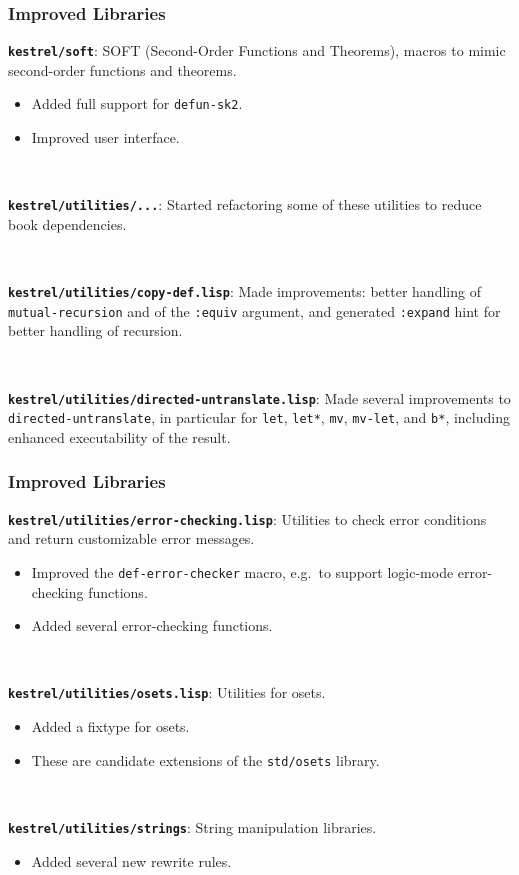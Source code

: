 \documentclass{beamer}
\newcommand{\code}[1]{\texttt{#1}}
\newcommand{\bookpath}[1]{\textbf{\code{#1}}}
\newcommand{\implibtitle}{\frametitle{Improved Libraries}}
\begin{document}
\begin{frame}

\implibtitle

\bookpath{kestrel/soft}:
SOFT (Second-Order Functions and Theorems),
macros to mimic second-order functions and theorems.
\begin{itemize}
\item
Added full support for \code{defun-sk2}.
\item
Improved user interface.
\end{itemize}

\

\bookpath{kestrel/utilities/...}:
Started refactoring some of these utilities to reduce book dependencies.

\

\bookpath{kestrel/utilities/copy-def.lisp}:
Made improvements: better handling of \code{mutual-recursion} and of
the \code{:equiv} argument, and generated \code{:expand} hint for better
handling of recursion.

\

\bookpath{kestrel/utilities/directed-untranslate.lisp}:
Made several improvements to \code{directed-untranslate}, in particular
for \code{let}, \code{let*}, \code{mv}, \code{mv-let}, and \code{b*},
including enhanced executability of the result.

\end{frame}


\begin{frame}

\implibtitle

\bookpath{kestrel/utilities/error-checking.lisp}:
Utilities to check error conditions and return customizable error messages.
\begin{itemize}
\item
Improved the \code{def-error-checker} macro,
e.g.\ to support logic-mode error-checking functions.
\item
Added several error-checking functions.
\end{itemize}

\

\bookpath{kestrel/utilities/osets.lisp}:
Utilities for osets.
\begin{itemize}
\item
Added a fixtype for osets.
\item
These are candidate extensions of the \code{std/osets} library.
\end{itemize}

\

\bookpath{kestrel/utilities/strings}:
String manipulation libraries.
\begin{itemize}
\item Added several new rewrite rules.
\end{itemize}

\end{frame}
\end{document}
